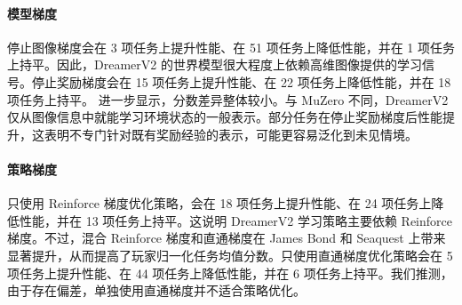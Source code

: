 \paragraph{模型梯度}

停止图像梯度会在 3 项任务上提升性能、在 51 项任务上降低性能，并在 1 项任务上持平。因此，DreamerV2 的世界模型很大程度上依赖高维图像提供的学习信号。停止奖励梯度会在 15 项任务上提升性能、在 22 项任务上降低性能，并在 18 项任务上持平。 进一步显示，分数差异整体较小。与 MuZero 不同，DreamerV2 仅从图像信息中就能学习环境状态的一般表示。部分任务在停止奖励梯度后性能提升，这表明不专门针对既有奖励经验的表示，可能更容易泛化到未见情境。

\paragraph{策略梯度}

只使用 Reinforce 梯度优化策略，会在 18 项任务上提升性能、在 24 项任务上降低性能，并在 13 项任务上持平。这说明 DreamerV2 学习策略主要依赖 Reinforce 梯度。不过，混合 Reinforce 梯度和直通梯度在 James Bond 和 Seaquest 上带来显著提升，从而提高了玩家归一化任务均值分数。只使用直通梯度优化策略会在 5 项任务上提升性能、在 44 项任务上降低性能，并在 6 项任务上持平。我们推测，由于存在偏差，单独使用直通梯度并不适合策略优化。
